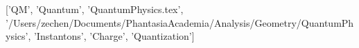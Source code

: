 ['QM', 'Quantum', 'QuantumPhysics.tex', '/Users/zechen/Documents/PhantasiaAcademia/Analysis/Geometry/QuantumPhysics', 'Instantons', 'Charge', 'Quantization']
